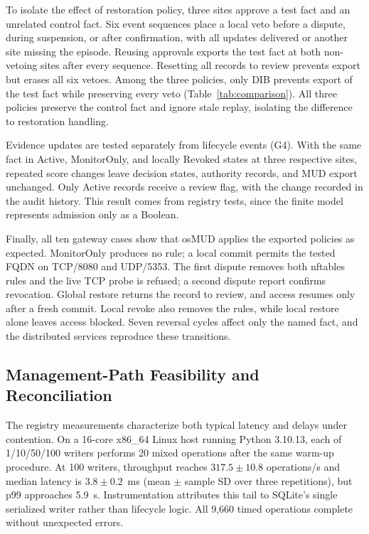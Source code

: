 \documentclass[journal]{IEEEtran}
\theoremstyle{definition}
\begin{document}
To isolate the effect of restoration policy, three sites approve a test fact and an unrelated control fact. Six event sequences place a local veto before a dispute, during suspension, or after confirmation, with all updates delivered or another site missing the episode. Reusing approvals exports the test fact at both non-vetoing sites after every sequence. Resetting all records to review prevents export but erases all six vetoes. Among the three policies, only DIB prevents export of the test fact while preserving every veto (Table~\ref{tab:comparison}). All three policies preserve the control fact and ignore stale replay, isolating the difference to restoration handling.

Evidence updates are tested separately from lifecycle events (G4). With the same fact in Active, MonitorOnly, and locally Revoked states at three respective sites, repeated score changes leave decision states, authority records, and MUD export unchanged. Only Active records receive a review flag, with the change recorded in the audit history. This result comes from registry tests, since the finite model represents admission only as a Boolean.

Finally, all ten gateway cases show that osMUD applies the exported policies as expected. MonitorOnly produces no rule; a local commit permits the tested FQDN on TCP/8080 and UDP/5353. The first dispute removes both nftables rules and the live TCP probe is refused; a second dispute report confirms revocation. Global restore returns the record to review, and access resumes only after a fresh commit. Local revoke also removes the rules, while local restore alone leaves access blocked. Seven reversal cycles affect only the named fact, and the distributed services reproduce these transitions.

\subsection{Management-Path Feasibility and Reconciliation}
\label{sec:scalability-results}
The registry measurements characterize both typical latency and delays under contention. On a 16-core x86\_64 Linux host running Python 3.10.13, each of 1/10/50/100 writers performs 20 mixed operations after the same warm-up procedure. At 100 writers, throughput reaches $317.5\pm10.8$ operations/s and median latency is $3.8\pm0.2$~ms (mean $\pm$ sample SD over three repetitions), but p99 approaches 5.9~s. Instrumentation attributes this tail to SQLite's single serialized writer rather than lifecycle logic. All 9,660 timed operations complete without unexpected errors.
\end{document}
